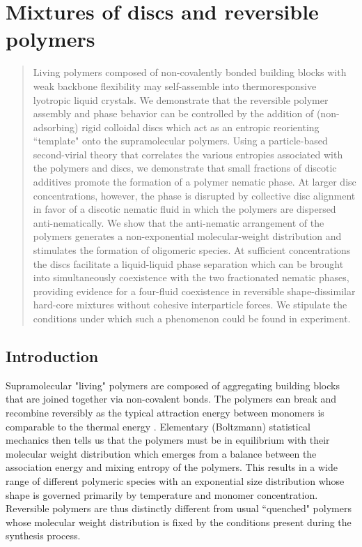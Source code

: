 
\chapter{Mixtures of discs and reversible polymers}

\begin{abstract}
Living polymers composed of non-covalently bonded  building blocks with weak backbone flexibility may self-assemble into thermoresponsive lyotropic liquid crystals. We demonstrate that the reversible polymer assembly and phase behavior  can be  controlled by the addition of (non-adsorbing) rigid colloidal discs which act as an entropic reorienting ``template"  onto the supramolecular polymers. Using a particle-based second-virial theory that correlates the various entropies associated with the polymers and discs, we demonstrate that small fractions of discotic additives promote the formation of a polymer nematic phase. At larger disc concentrations, however, the phase is disrupted by collective disc alignment in favor of a discotic nematic fluid in which the polymers are dispersed anti-nematically. We show that the anti-nematic arrangement of the polymers generates a non-exponential molecular-weight distribution and stimulates the formation of oligomeric species. At sufficient concentrations the discs  facilitate a liquid-liquid phase separation which can be brought into simultaneously coexistence with the two fractionated nematic phases, providing evidence for a four-fluid coexistence in reversible shape-dissimilar hard-core mixtures without cohesive interparticle forces.  We  stipulate the conditions under which such a phenomenon could be found in experiment.
\end{abstract}


\section{Introduction}


 Supramolecular "living" polymers are composed of  aggregating building blocks that are joined together via non-covalent bonds.  The polymers can break and recombine reversibly as the typical attraction energy between monomers is comparable to the thermal energy \cite{cates87,cates88}.  Elementary (Boltzmann) statistical mechanics then tells us that the polymers must be in equilibrium with their molecular weight distribution which emerges from a balance between the association energy and mixing entropy of the polymers. This results in a wide range of different polymeric species with an exponential size distribution whose shape is governed primarily by temperature and  monomer concentration. Reversible polymers are thus distinctly different from usual ``quenched" polymers whose molecular weight distribution is fixed  by the conditions present during the synthesis process.
 
